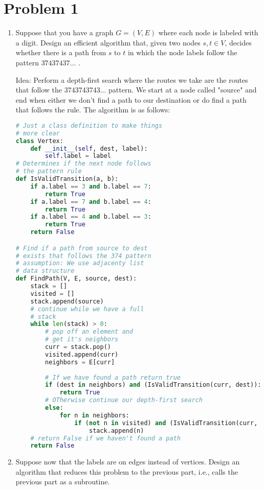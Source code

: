 \documentclass[11pt, letterpaper]{article}
\begin{document}
\section*{Problem 1}

\begin{enumerate}
\item Suppose that you have a graph $G = (V, E)$ where each node is labeled with a digit. Design an efficient algorithm that, given two nodes $s, t \in V$, decides whether there is a path from $s$ to $t$ in which the node labels follow the pattern $37437437...$ .

\quad Idea: Perform a depth-first search where the routes we take are the routes that follow the 3743743743... pattern. We start at a node called "source" and end when either we don't find a path to our destination or do find a path that follows the rule. The algorithm is as follows:

\begin{lstlisting}[language=python]
# Just a class definition to make things
# more clear
class Vertex:
    def __init__(self, dest, label):
        self.label = label
# Determines if the next node follows
# the pattern rule
def IsValidTransition(a, b):
    if a.label == 3 and b.label == 7:
        return True
    if a.label == 7 and b.label == 4:
        return True
    if a.label == 4 and b.label == 3:
        return True
    return False

# Find if a path from source to dest
# exists that follows the 374 pattern
# assumption: We use adjacenty list
# data structure
def FindPath(V, E, source, dest):
    stack = []
    visited = []
    stack.append(source)
    # continue while we have a full 
    # stack
    while len(stack) > 0:
        # pop off an element and 
        # get it's neighbors
        curr = stack.pop()
        visited.append(curr)
        neighbors = E[curr]
        
        # If we have found a path return true
        if (dest in neighbors) and (IsValidTransition(curr, dest)):
            return True
        # OTherwise continue our depth-first search
        else:
            for n in neighbors:
                if (not n in visited) and (IsValidTransition(curr, n)):
                    stack.append(n)
    # return False if we haven't found a path
    return False
\end{lstlisting}

\pagebreak

\item Suppose now that the labels are on edges instead of vertices. Design an algorithm that reduces this problem to the previous part, i.e., calls the previous part as a subroutine.


\end{enumerate}
\end{document}
